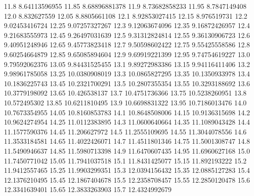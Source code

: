            11.8    8.64113596955
          11.85    8.68896881378
           11.9    8.73682858233
          11.95     8.7847149408
           12.0      8.832627559
          12.05     8.8805661108
           12.1    8.92853027415
          12.15      8.976519731
           12.2    9.02453416724
          12.25    9.07257327267
           12.3    9.12063674096
          12.35    9.16872426957
           12.4    9.21683555973
          12.45    9.26497031639
           12.5    9.31312824814
          12.55    9.36130906723
           12.6    9.40951248946
          12.65    9.45773823418
           12.7    9.50598602422
          12.75    9.55425558586
           12.8    9.60254664879
          12.85    9.65085894604
           12.9    9.69919221399
          12.95    9.74754619227
           13.0    9.79592062376
          13.05    9.84431525455
           13.1    9.89272983386
          13.15    9.94116411406
           13.2    9.98961785058
          13.25    10.0380908019
           13.3    10.0865827295
          13.35    10.1350933978
           13.4    10.1836225743
          13.45    10.2321700291
           13.5    10.2807355354
          13.55    10.3293188692
           13.6    10.3779198092
          13.65     10.426538137
           13.7    10.4751736366
          13.75    10.5238260951
           13.8     10.572495302
          13.85    10.6211810495
           13.9    10.6698831322
          13.95    10.7186013476
           14.0    10.7673354955
          14.05    10.8160853783
           14.1    10.8648508006
          14.15    10.9136315698
           14.2    10.9624274954
          14.25    11.0112383895
           14.3    11.0600640664
          14.35    11.1089043428
           14.4    11.1577590376
          14.45     11.206627972
           14.5    11.2555109695
          14.55    11.3044078556
           14.6    11.3533184581
          14.65    11.4022426071
           14.7    11.4511801346
          14.75    11.5001308747
           14.8    11.5490946637
          14.85    11.5980713398
           14.9    11.6470607435
          14.95    11.6960627168
           15.0    11.7450771042
          15.05    11.7941037518
           15.1    11.8431425077
          15.15     11.892193222
           15.2    11.9412557465
          15.25    11.9903299351
           15.3    12.0394156432
          15.35    12.0885127283
           15.4    12.1376210495
          15.45    12.1867404678
           15.5    12.2358708457
          15.55    12.2850120478
           15.6    12.3341639401
          15.65    12.3833263903
           15.7    12.4324992679
